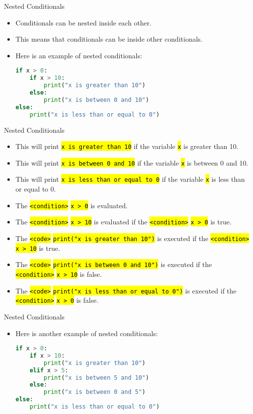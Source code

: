 \documentclass[
    aspectratio=169, 
    usepdftitle=false, 
    xcolor={dvipsnames},
    hyperref={
        colorlinks,
        linkcolor=black,
        urlcolor=blue}
    ]{beamer}
\let\OldTexttt\texttt
\renewcommand{\texttt}[1]{\OldTexttt{\hl{#1}}}%
\begin{document}
\begin{frame}[fragile]{Nested Conditionals}
    \begin{itemize}
        \item Conditionals can be nested inside each other.
        \item This means that conditionals can be inside other conditionals.
        \item Here is an example of nested conditionals:
        \begin{lstlisting}[language=Python]
if x > 0:
    if x > 10:
        print("x is greater than 10")
    else:
        print("x is between 0 and 10")
else:
    print("x is less than or equal to 0")
        \end{lstlisting}
    \end{itemize}
\end{frame}

\begin{frame}[fragile]{Nested Conditionals}
    \begin{itemize}
        \item This will print \texttt{x is greater than 10} if the variable \texttt{x} is greater than 10.
        \item This will print \texttt{x is between 0 and 10} if the variable \texttt{x} is between 0 and 10.
        \item This will print \texttt{x is less than or equal to 0} if the variable \texttt{x} is less than or equal to 0.
        \item The \texttt{<condition>} \texttt{x > 0} is evaluated.
        \item The \texttt{<condition>} \texttt{x > 10} is evaluated if the \texttt{<condition>} \texttt{x > 0} is true.
        \item The \texttt{<code>} \texttt{print("x is greater than 10")} is executed if the \texttt{<condition>} \texttt{x > 10} is true.
        \item The \texttt{<code>} \texttt{print("x is between 0 and 10")} is executed if the \texttt{<condition>} \texttt{x > 10} is false.
        \item The \texttt{<code>} \texttt{print("x is less than or equal to 0")} is executed if the \texttt{<condition>} \texttt{x > 0} is false.
    \end{itemize}
\end{frame}

\begin{frame}[fragile]{Nested Conditionals}
    \begin{itemize}
        \item Here is another example of nested conditionals:
        \begin{lstlisting}[language=Python]
if x > 0:
    if x > 10:
        print("x is greater than 10")
    elif x > 5:
        print("x is between 5 and 10")
    else:
        print("x is between 0 and 5")
else:
    print("x is less than or equal to 0")
        \end{lstlisting}
    \end{itemize}
\end{frame}
\end{document}
